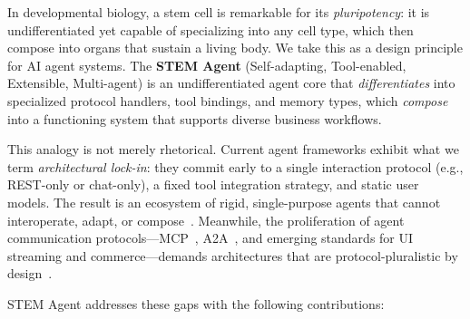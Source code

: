 \documentclass{article}
\begin{document}
In developmental biology, a stem cell is remarkable for its \emph{pluripotency}: it is undifferentiated yet capable of specializing into any cell type, which then compose into organs that sustain a living body. We take this as a design principle for AI agent systems. The \textbf{STEM Agent} (Self-adapting, Tool-enabled, Extensible, Multi-agent) is an undifferentiated agent core that \emph{differentiates} into specialized protocol handlers, tool bindings, and memory types, which \emph{compose} into a functioning system that supports diverse business workflows.

This analogy is not merely rhetorical. Current agent frameworks exhibit what we term \emph{architectural lock-in}: they commit early to a single interaction protocol (e.g., REST-only or chat-only), a fixed tool integration strategy, and static user models. The result is an ecosystem of rigid, single-purpose agents that cannot interoperate, adapt, or compose~\citep{ferrag2025agents, tran2025multiagent}. Meanwhile, the proliferation of agent communication protocols---MCP~\citep{ehtesham2025survey}, A2A~\citep{habler2025a2a}, and emerging standards for UI streaming and commerce---demands architectures that are protocol-pluralistic by design~\citep{li2025gluetoprotocols}.

STEM Agent addresses these gaps with the following contributions:
\end{document}
